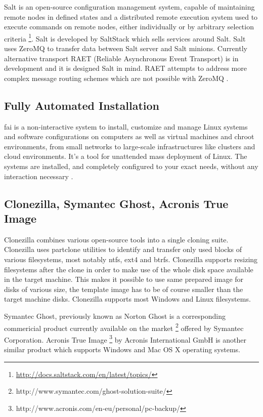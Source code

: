 \documentclass[a4paper,11pt]{kth-mag}
\begin{document}
Salt is an open-source configuration management system,
capable of maintaining remote nodes in defined states and
a distributed remote execution system used to execute commands
on remote nodes, either individually or by arbitrary selection criteria
\footnote{\url{http://docs.saltstack.com/en/latest/topics/}}.
Salt is developed by SaltStack which sells services around Salt.
Salt uses ZeroMQ to transfer data between Salt server and
Salt minions.
Currently alternative transport
RAET (Reliable Asynchronous Event Transport)
is in development and it is designed Salt in mind.
RAET attempts to address more complex message routing
schemes which are not possible with ZeroMQ \cite{raet}.


\subsection{Fully Automated Installation}

\acrfull{fai} is a non-interactive system to install, customize and manage
Linux systems and software configurations on computers as well as
virtual machines and chroot environments, from small networks to
large-scale infrastructures like clusters and cloud environments.
It's a tool for unattended mass deployment of Linux. The systems
are installed, and completely configured to your exact needs,
without any interaction necessary \cite{fai}.

\subsection{Clonezilla, Symantec Ghost, Acronis True Image}

Clonezilla \cite{clonezilla}
combines various open-source tools into a single cloning suite.
Clonezilla uses partclone utilities \cite{partclone} to
identify and transfer only used blocks of various filesystems, most notably
\acrshort{ntfs}, \acrshort{ext4} and \acrshort{btrfs}.
Clonezilla supports resizing filesystems after the clone
in order to make use of the whole disk space available
in the target machine.
This makes it possible to use same prepared image for disks of
various size, the template image has to be of course smaller
than the target machine disks.
Clonezilla supports most Windows and Linux filesystems.

Symantec Ghost, previously known as Norton Ghost is a corresponding commericial
product currently available on the market
\footnote{http://www.symantec.com/ghost-solution-suite/}
offered by Symantec Corporation.
Acronis True Image
\footnote{http://www.acronis.com/en-eu/personal/pc-backup/}
by Acronis International GmbH
is another similar product which supports Windows
and Mac OS X operating systems.
\end{document}
